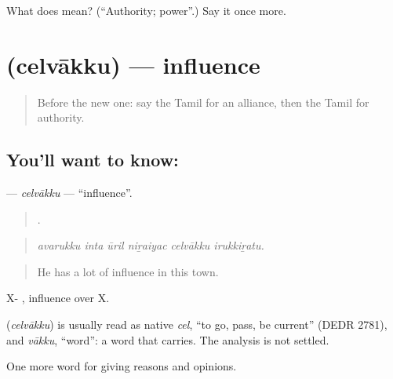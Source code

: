 \begin{tcolorbox}[breakable,colback=teal!4,colframe=teal!35!black,title={Before you move on}]
What does  mean? (\textquotedblleft{}Authority; power\textquotedblright{}.) Say it once more.
\end{tcolorbox}
\section[\texorpdfstring{\ta{செல்வாக்கு} (celvākku)}{செல்வாக்கு (celvākku)}]{ (celvākku) — influence}

\label{lesson:TA-C375-celvakku}



\begin{quote}
Before the new one: say the Tamil for an alliance, then the Tamil for authority.
\end{quote}

\subsection*{You'll want to know: }
\textbf{} — \emph{celvākku} — \textquotedblleft{}influence\textquotedblright{}.

\begin{quote}
     .
\end{quote}

\begin{quote}
\emph{avarukku inta ūril niṟaiyac celvākku irukkiṟatu.}
\end{quote}

\begin{quote}
He has a lot of influence in this town.
\end{quote}

X-  , influence over X.

\begin{cousinweb}
\textbf{} (\emph{celvākku}) is usually read as native \emph{cel}, \textquotedblleft{}to go, pass, be current\textquotedblright{} (DEDR 2781), and \emph{vākku}, \textquotedblleft{}word\textquotedblright{}: a word that carries. The analysis is not settled.
\end{cousinweb}

\begin{grammarlens}[title={What you've built}]
One more word for giving reasons and opinions.
\end{grammarlens}

